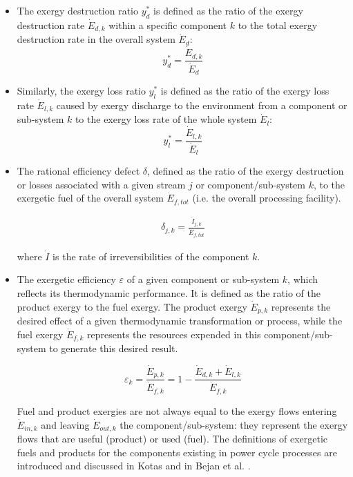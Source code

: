 \documentclass[final,times,5p]{elsarticle}
\begin{document}
	\begin{itemize}	
		\item The exergy destruction ratio $y_{d}^{*}$ is defined as the ratio of the exergy destruction rate $\dot{E}_{d,k}$ within a specific component $k$ to the total exergy destruction rate in the overall system $\dot{E}_{d}$:  
	\begin{equation} y_{d}^{*}=\frac{\dot{E}_{d,k}}{\dot{E}_{d}} \end{equation}
	
		\item Similarly, the exergy loss ratio $y_{l}^{*}$ is defined as the ratio of the exergy loss rate $\dot{E}_{l,k}$ caused by exergy discharge to the environment from a component or sub-system $k$ to the exergy loss rate of the whole system $\dot{E}_{l}$:  
	\begin{equation} y_{l}^{*}=\frac{\dot{E}_{l,k}}{\dot{E}_{l}} \end{equation}

	\item The rational efficiency defect $\delta$, defined as the ratio of the exergy destruction or losses associated with a given stream $j$ or component/sub-system $k$, to the exergetic fuel of the overall system $\dot{E}_{f,tot}$ (i.e. the overall processing facility).
	
	\begin{align}
		\delta_{j,k} = \frac{\dot{I}_{j,k}}{\dot{E}_{f,tot}}
	\end{align}
	
		where $\dot{I}$ is the rate of irreversibilities of the component $k$. 
		
		\item The exergetic efficiency $\varepsilon$ of a given component or sub-system $k$, which reflects its thermodynamic performance. It is defined as the ratio of the product exergy to the fuel exergy. The product exergy $\dot{E}_{p,k}$ represents the desired effect of a given thermodynamic transformation or process, while the fuel exergy $\dot{E}_{f,k}$ represents the resources expended in this component/sub-system to generate this desired result. 
	
	\begin{equation}
		\varepsilon_k=\frac{\dot{E}_{p,k}}{\dot{E}_{f,k}}=1-\frac{\dot{E}_{d,k}+\dot{E}_{l,k}}{\dot{E}_{f,k}}
	\end{equation}
	
	Fuel and product exergies are not always equal to the exergy flows entering $\dot{E}_{in,k}$ and leaving $\dot{E}_{out,k}$ the component/sub-system: they represent the exergy flows that are useful (product) or used (fuel). The definitions of exergetic fuels and products for the components existing in power cycle processes are introduced and discussed in Kotas \cite{Kotas1980,Kotas1980a,Kotas1995} and in Bejan et al. \cite{BejanAdrian;TsatsaronisGeorge;Moran1996}. 

	\end{itemize}
	
\end{document}
